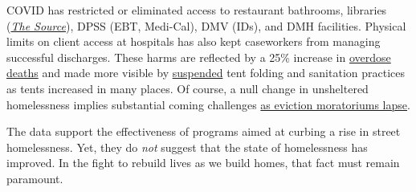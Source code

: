 \documentclass[11pt]{article}
\begin{document}
COVID has restricted or eliminated access to restaurant bathrooms, libraries 
(\href{https://www.lapl.org/homeless-resources/the-source}{\it The Source}), DPSS 
(EBT, Medi-Cal), DMV (IDs), and DMH facilities. Physical limits on client access at 
hospitals has also kept caseworkers from managing successful discharges. These harms 
are reflected by a 25\% increase in 
\href{https://www.latimes.com/california/story/2021-01-07/the-powerful-synthetic-opioid-fentanyl-is-behind-rising-deaths-in-the-homeless-population}{overdose deaths} and made more visible by \href{https://clkrep.lacity.org/onlinedocs/2020/20-0147_misc_3-17-20_p.pdf}{suspended}
tent folding and sanitation practices as tents increased in many places. 
Of course, a null change in unsheltered homelessness implies substantial coming challenges
 \href{https://www.latimes.com/california/story/2021-01-12/new-report-foresees-tens-of-thousands-losing-homes-by-2023}
{as eviction moratoriums lapse}.

The data support the effectiveness of programs aimed at curbing a rise in street homelessness.
Yet, they do {\it not} suggest that the state of homelessness has improved. In the fight to rebuild 
lives as we build homes, that fact must remain paramount.

\end{document}
